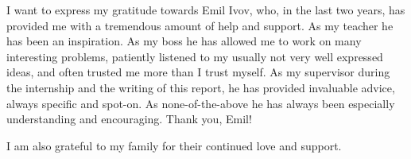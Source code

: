 I want to express my gratitude towards Emil Ivov, who, in the last two years,
has provided me with a tremendous amount of help and support. As my teacher he has been an
inspiration. As my boss he has allowed me to work on many interesting problems,
patiently listened to my usually not very well expressed ideas, and often
trusted me more than I trust myself. As my supervisor during the internship and
the writing of this report, he has provided invaluable advice, always specific and spot-on.
As none-of-the-above he has always been especially understanding and encouraging. Thank you, Emil!

I am also grateful to my family for their continued love and support.

